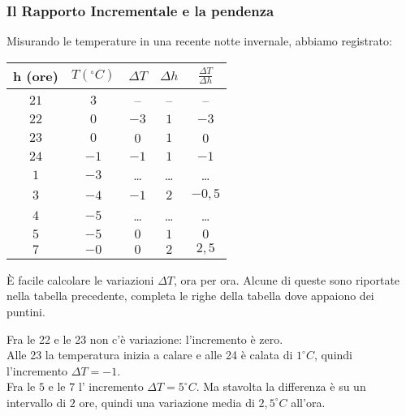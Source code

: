 \subsubsection{Il Rapporto Incrementale e la pendenza}
\label{subsubsec:RI}
\begin{esempio}
Misurando le temperature in una recente notte invernale, abbiamo registrato:

\noindent \begin{minipage}{0.48\textwidth}
 \begin{center}
\begin{tabular}{ccccc}\toprule
h (ore) & \(T (^\circ \! C)\) & \(\Delta T\) & \(\Delta h\)
             & \(\frac{\Delta T}{\Delta h}\)\\\midrule
\(21\) & \(3\) & -- & -- & -- \\
\(22\) & \(0\) & \(-3\) & \(1\) &\(-3\) \\
\(23\) & \(0\) & 0 & \(1\) & 0 \\
\(24\) & \(-1\) & \(-1\) & \(1\) & \(-1\) \\
\(1\) & \(-3\) &\dots &\dots & \dots\\
\(3\)  & \(-4\) & \(-1\) & \(2\) &\(-0,5\)\\
\(4\)  & \(-5\) &\dots &\dots & \dots\\
\(5\)  & \(-5\) & \(0\)  & \(1\) &\(0\)\\
\(7\)  & \(-0\) & \(0\) & \(2\) & \(2,5\)
\\ \bottomrule
\end{tabular}
\label{tab:temperaturea}
\end{center}
\end{minipage}
 \hfill
\begin{minipage}{.48 \textwidth}
\begin{inaccessibleblock}
\begin{center} \scalebox{1}{\temperaturea} \end{center}
\end{inaccessibleblock}
\label{graf:temperaturea}
\end{minipage}

È facile calcolare le variazioni \(\Delta T\), ora per ora. 
Alcune di queste sono riportate nella tabella precedente, 
completa le righe della tabella dove appaiono dei puntini.

Fra le 22 e le 23 non c'è variazione: l'incremento è zero. \\
Alle 23 la temperatura inizia a calare e alle 24 è calata di 
\(1^\circ C\), quindi l'incremento \( \Delta T=-1\). \\
Fra le \(5\) e le \(7\) l' incremento \(\Delta T= 5 ^\circ C\). 
Ma stavolta la differenza è su un intervallo di \(2\) ore, 
quindi una variazione media di \(2,5 ^\circ C\) all'ora.


\end{esempio}
